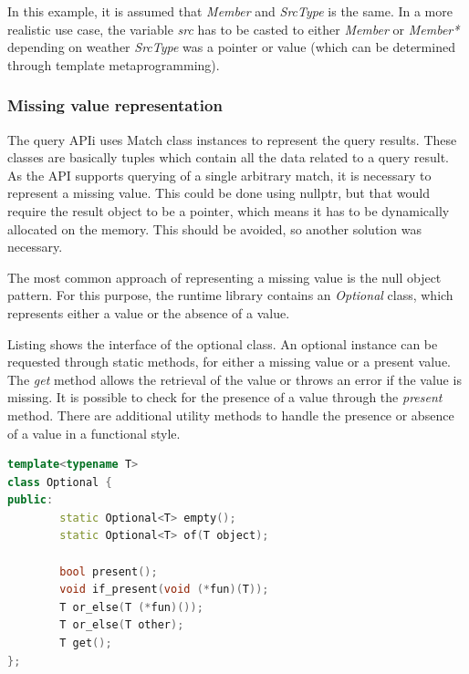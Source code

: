 In this example, it is assumed that \emph{Member} and \emph{SrcType} is the
same. In a more realistic use case, the variable \emph{src} has to be casted to
either \emph{Member} or \emph{Member*} depending on weather \emph{SrcType} was a
pointer or value (which can be determined through template metaprogramming).

\subsubsection{Missing value representation}
\label{sect:MissingValueRepresentation}

The query APIi uses Match class instances to represent the query results. These
classes are basically tuples which contain all the data related to a query
result. As the API supports querying of a single arbitrary match, it is
necessary to represent a missing value. This could be done using nullptr, but
that would require the result object to be a pointer, which means it has to be
dynamically allocated on the memory. This should be avoided, so another solution
was necessary.

The most common approach of representing a missing value is the null object
pattern. For this purpose, the runtime library contains an \emph{Optional}
class, which represents either a value or the absence of a value.

Listing  shows the interface of the optional class. An
optional instance can be requested through static methods, for either a missing
value or a present value. The \emph{get} method allows the retrieval of the
value or throws an error if the value is missing. It is possible to check for
the presence of a value through the \emph{present} method. There are additional
utility methods to handle the presence or absence of a value in a functional
style.

\begin{lstlisting}[frame=single,float=!ht,language=C++,label=listing:optional,
caption=Optional interface] 
template<typename T>
class Optional {
public:
        static Optional<T> empty();
        static Optional<T> of(T object);

        bool present();
        void if_present(void (*fun)(T));
        T or_else(T (*fun)());
        T or_else(T other);
        T get();
};
\end{lstlisting}

